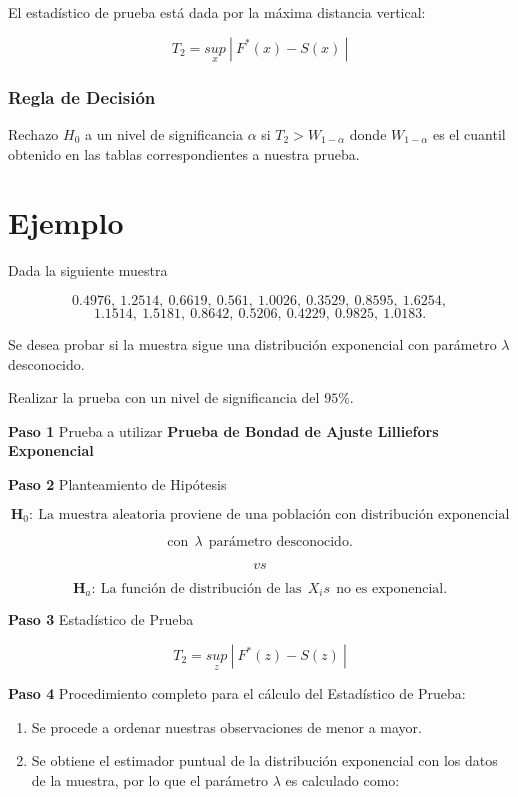 \documentclass[
  a4paper,
  oneside,
  openany]{book}
\begin{document}
El estadístico de prueba está dada por la máxima distancia vertical:

\[T_{2}=\underset{x}{sup} \ | \ F^*(x)-S(x) \ |\]

\hypertarget{regla-de-decisiuxf3n-33}{%
\subsubsection*{Regla de Decisión}\label{regla-de-decisiuxf3n-33}}


Rechazo \(H_0\) a un nivel de significancia \(\alpha\) si \(T_{2}> W_{1-\alpha}\) donde \(W_{1-\alpha}\) es el cuantil obtenido en las tablas correspondientes a nuestra prueba.

\hypertarget{ejemplo-15}{%
\section{Ejemplo}\label{ejemplo-15}}

Dada la siguiente muestra

\[0.4976,\ 1.2514,\ 0.6619,\ 0.561,\ 1.0026,\ 0.3529,\ 0.8595,\ 1.6254,\]
\[1.1514,\ 1.5181,\ 0.8642,\ 0.5206,\ 0.4229,\ 0.9825,\ 1.0183.\]

Se desea probar si la muestra sigue una distribución exponencial con parámetro \(\lambda\) desconocido.

Realizar la prueba con un nivel de significancia del \(95\%\).

\textbf{Paso 1} Prueba a utilizar \textbf{Prueba de Bondad de Ajuste Lilliefors Exponencial}

\textbf{Paso 2} Planteamiento de Hipótesis

\[\textbf{H}_0: \ \mbox{La muestra aleatoria proviene de una población con distribución exponencial}\]

\[\mbox{con} \ \  \lambda \ \  \mbox{parámetro desconocido.}\]

\[vs\]

\[\textbf{H}_a: \ \mbox{La función de distribución de las} \ \  X_{i}s \ \  \mbox{no es exponencial.}\]

\textbf{Paso 3} Estadístico de Prueba

\[T_{2}=\underset{z}{sup} \ | \ F^*(z)-S(z) \ |\]

\textbf{Paso 4} Procedimiento completo para el cálculo del Estadístico de Prueba:

\begin{enumerate}
\def\labelenumi{\arabic{enumi})}
\item
  Se procede a ordenar nuestras observaciones de menor a mayor.
\item
  Se obtiene el estimador puntual de la distribución exponencial con los datos de la muestra, por lo que el parámetro \(\lambda\) es calculado como:
\end{enumerate}
\end{document}
